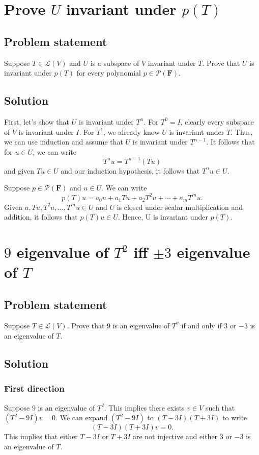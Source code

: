 \documentclass{article}
\begin{document}
\clearpage

\section{Prove $U$ invariant under $p(T)$}
\subsection*{Problem statement}
Suppose $T\in\mathcal{L}(V)$ and $U$ is a subspace of $V$ invariant under $T$. 
Prove that $U$ is invariant under $p(T)$ for every polynomial $p\in\mathcal{P}(\mathbf{F})$.

\subsection*{Solution}
First, let's show that $U$ is invariant under $T^n$. 
For $T^0=I$, clearly every subspace of $V$ is invariant under $I$. 
For $T^1$, we already know $U$ is invariant under $T$. 
Thus, we can use induction and assume that $U$ is invariant under $T^{n-1}$. 
It follows that for $u\in U$, we can write
\[T^nu=T^{n-1}(Tu)\]
and given $Tu\in U$ and our induction hypothesis, it follows that $T^nu\in U$.

Suppose $p\in\mathcal{P}(\mathbf{F})$ and $u\in U$. 
We can write
\[p(T)u=a_0u+a_1Tu+a_2T^2u+\cdots+a_mT^mu.\]
Given $u,Tu,T^2u,\ldots,T^mu\in U$ and $U$ is closed under scalar multiplication and addition, it follows that $p(T)u\in U$. 
Hence, U is invariant under $p(T)$.

\clearpage

\section{$9$ eigenvalue of $T^2$ iff $\pm 3$ eigenvalue of $T$}
\subsection*{Problem statement}
Suppose $T\in\mathcal{L}(V)$. 
Prove that $9$ is an eigenvalue of $T^2$ if and only if $3$ or $-3$ is an eigenvalue of $T$.

\subsection*{Solution}
\subsubsection*{First direction}
Suppose $9$ is an eigenvalue of $T^2$. 
This implies there exists $v\in V$ such that $(T^2-9I)v=0$. 
We can expand $(T^2-9I)$ to $(T-3I)(T+3I)$ to write
\[(T-3I)(T+3I)v=0.\]
This implies that either $T-3I$ or $T+3I$ are not injective and either $3$ or $-3$ is an eigenvalue of $T$.
\end{document}
